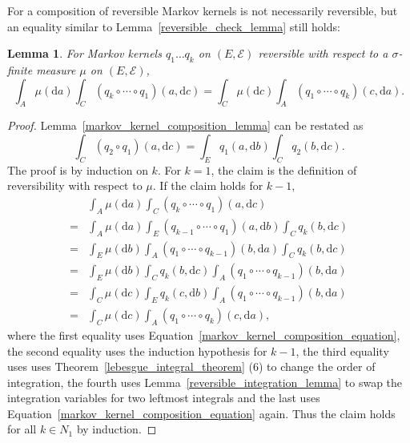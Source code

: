 \documentclass[english,twoside,openright]{HYgraduMLDS}
\newtheorem{lemma}{Lemma}[chapter]
\newcommand{\dx}{\mathrm{d}}
\begin{document}
For a composition of reversible Markov kernels is not necessarily reversible,
but an equality similar to Lemma~\ref{reversible_check_lemma} still holds:
\begin{lemma}\label{composition_reversible_multiple_lemma}
  For Markov kernels \(q_{1}\dotsc q_{k}\) on \((E, \mathcal{E})\) reversible
  with respect to a \(\sigma\)-finite measure \(\mu\) on \((E, \mathcal{E})\),
  \[
    \int_{A}\mu(\dx a)\int_{C}(q_{k}\circ \dotsb \circ q_{1})(a, \dx c)
    = \int_{C}\mu(\dx c)\int_{A}(q_{1}\circ \dotsb \circ q_{k})(c, \dx a).
  \]
\end{lemma}
\begin{proof}
  Lemma~\ref{markov_kernel_composition_lemma} can be restated as
  \begin{equation}\label{markov_kernel_composition_equation}
    \int_{C}(q_{2}\circ q_{1})(a, \dx c) = \int_{E}q_{1}(a, \dx b)\int_{C}q_{2}(b, \dx c).
  \end{equation}
  The proof is by induction on \(k\). For \(k = 1\), the claim is the definition
  of reversibility with respect to \(\mu\). If the claim holds for \(k - 1\),
  \begin{align*}
    &\int_{A}\mu(\dx a)\int_{C}(q_{k}\circ\dotsb \circ q_{1})(a, \dx c)
    \\=& \int_{A}\mu(\dx a)\int_{E}(q_{k-1}\circ \dotsb \circ q_{1})(a, \dx b)
      \int_{C}q_{k}(b, \dx c)
    \\=& \int_{E}\mu(\dx b)\int_{A}(q_{1}\circ \dotsb \circ q_{k-1})(b, \dx a)
      \int_{C}q_{k}(b, \dx c)
    \\=& \int_{E}\mu(\dx b)\int_{C}q_{k}(b, \dx c)
         \int_{A}(q_{1}\circ \dotsb \circ q_{k-1})(b, \dx a)
    \\=& \int_{C}\mu(\dx c) \int_{E}q_{k}(c, \dx b)
         \int_{A}(q_{1}\circ \dotsb \circ q_{k-1})(b, \dx a)
    \\=&\int_{C}\mu(\dx c)\int_{A}(q_{1}\circ\dotsb \circ q_{k})(c, \dx a),
  \end{align*}
  where the first equality uses Equation~\ref{markov_kernel_composition_equation},
  the second equality uses the induction hypothesis for \(k - 1\),
  the third equality uses uses Theorem~\ref{lebesgue_integral_theorem} (6)
  to change the order of integration, the fourth uses
  Lemma~\ref{reversible_integration_lemma}
  to swap the integration variables for two leftmost integrals
  and the last uses Equation~\ref{markov_kernel_composition_equation} again.
  Thus the claim holds for all \(k\in N_{1}\) by induction.
\end{proof}
\end{document}
